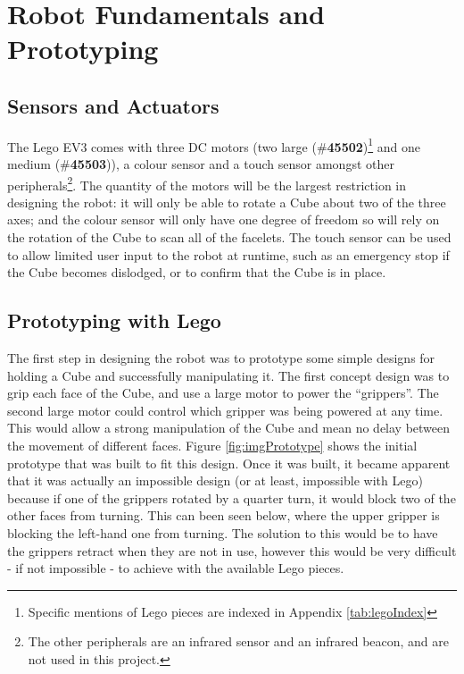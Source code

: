 \documentclass{report}
\newcommand{\tbo}[1]{\textbf{#1}}
\newcommand{\legopiece}[1]{(\#\tbo{#1})}
\begin{document}
    \section{Robot Fundamentals and Prototyping}
    
    \subsection{Sensors and Actuators}
    
    The Lego EV3 comes with three DC motors (two large \legopiece{45502}\footnote{Specific mentions of Lego pieces are indexed in Appendix \ref{tab:legoIndex}} and one medium \legopiece{45503}), a colour sensor and a touch sensor amongst other peripherals\footnote{The other peripherals are an infrared sensor and an infrared beacon, and are not used in this project.}. The quantity of the motors will be the largest restriction in designing the robot: it will only be able to rotate a Cube about two of the three axes; and the colour sensor will only have one degree of freedom so will rely on the rotation of the Cube to scan all of the facelets. The touch sensor can be used to allow limited user input to the robot at runtime, such as an emergency stop if the Cube becomes dislodged, or to confirm that the Cube is in place.
    
    \subsection{Prototyping with Lego}
    
    The first step in designing the robot was to prototype some simple designs for holding a Cube and successfully manipulating it. The first concept design was to grip each face of the Cube, and use a large motor to power the \enquote{grippers}. The second large motor could control which gripper was being powered at any time. This would allow a strong manipulation of the Cube and mean no delay between the movement of different faces. Figure \ref{fig:imgPrototype} shows the initial prototype that was built to fit this design. Once it was built, it became apparent that it was actually an impossible design (or at least, impossible with Lego) because if one of the grippers rotated by a quarter turn, it would block two of the other faces from turning. This can been seen below, where the upper gripper is blocking the left-hand one from turning. The solution to this would be to have the grippers retract when they are not in use, however this would be very difficult - if not impossible - to achieve with the available Lego pieces.
    
\end{document}

